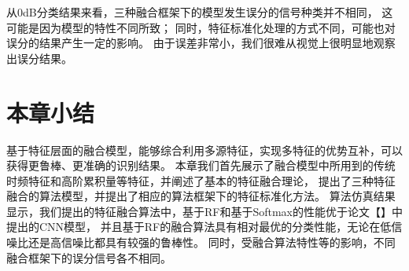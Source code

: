 从0dB分类结果来看，三种融合框架下的模型发生误分的信号种类并不相同，
这可能是因为模型的特性不同所致；
同时，特征标准化处理的方式不同，可能也对误分的结果产生一定的影响。
由于误差非常小，我们很难从视觉上很明显地观察出误分结果。

\section{本章小结}
基于特征层面的融合模型，能够综合利用多源特征，实现多特征的优势互补，可以获得更鲁棒、更准确的识别结果。
本章我们首先展示了融合模型中所用到的传统时频特征和高阶累积量等特征，并阐述了基本的特征融合理论，
提出了三种特征融合的算法模型，并提出了相应的算法框架下的特征标准化方法。
算法仿真结果显示，我们提出的特征融合算法中，基于RF和基于Softmax的性能优于论文【】中提出的CNN模型，
并且基于RF的融合算法具有相对最优的分类性能，无论在低信噪比还是高信噪比都具有较强的鲁棒性。
同时，受融合算法特性等的影响，不同融合框架下的误分信号各不相同。
\par
